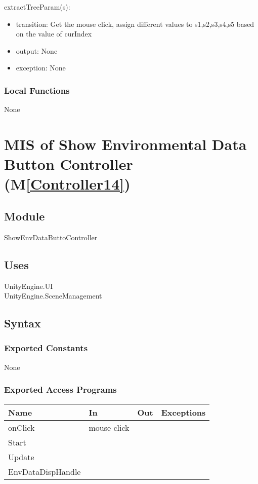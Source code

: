 \documentclass[12pt, titlepage]{article}
\newcommand{\mref}[1]{M\ref{#1}}
\begin{document}
\noindent extractTreeParam(s):
\begin{itemize}
\item transition: Get the mouse click, assign different values to s1,s2,s3,s4,s5 based on the value of curIndex
\item output: None
\item exception: None
\end{itemize}

\subsubsection{Local Functions}
None


\newpage

\section{MIS of Show Environmental Data Button Controller (\mref{Controller14})} 

\subsection{Module}

ShowEnvDataButtoController

\subsection{Uses}
UnityEngine.UI\\
UnityEngine.SceneManagement\\


\subsection{Syntax}

\subsubsection{Exported Constants}
None
\subsubsection{Exported Access Programs}

\begin{center}
\begin{tabular}{| l | l | l | p{5cm}|}
\hline
\textbf{Name} & \textbf{In} & \textbf{Out} & \textbf{Exceptions} \\
\hline
onClick & mouse click &  &  \\
\hline
Start &&&\\
\hline
Update &&&\\
\hline
EnvDataDispHandle &&&\\
\hline
\end{tabular}
\end{center}
\end{document}
